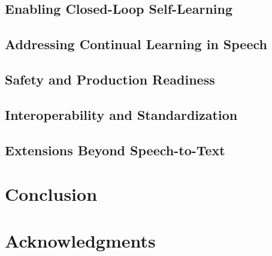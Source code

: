 \documentclass[conference]{IEEEtran}
\begin{document}
\subsection{Enabling Closed-Loop Self-Learning}

\subsection{Addressing Continual Learning in Speech}

\subsection{Safety and Production Readiness}

\subsection{Interoperability and Standardization}

\subsection{Extensions Beyond Speech-to-Text}

\section{Conclusion}

\section*{Acknowledgments}



\end{document}

